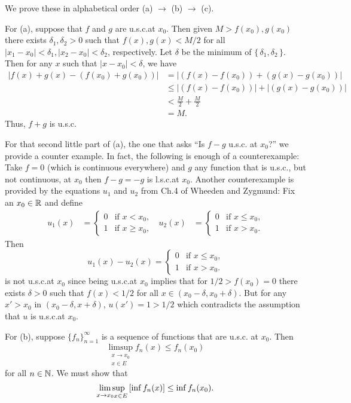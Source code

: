 \begin{solution}
  We prove these in alphabetical order (a) $\to$ (b) $\to$ (c).

  For (a), suppose that $f$ and $g$ are u.s.c.\@ at $x_0$. Then given
  $M>f(x_0),g(x_0)$ there exists $\delta_1,\delta_2>0$ such that
  $f(x),g(x)<M/2$ for all $|x_1-x_0|<\delta_1,|x_2-x_0|<\delta_2$,
  respectively. Let $\delta$ be the minimum of
  $\{\,\delta_1,\delta_2\,\}$. Then for any $x$ such that $|x-x_0|<\delta$,
  we have
  \begin{align*}
    |f(x)+g(x)-(f(x_0)+g(x_0))|
    &=|(f(x)-f(x_0))+(g(x)-g(x_0))|\\
    &\leq |(f(x)-f(x_0))|+|(g(x)-g(x_0))|\\
    &<\frac{M}{2}+\frac{M}{2}\\
    &=M.
  \end{align*}
  Thus, $f+g$ is u.s.c.

  For that second little part of (a), the one that asks ``Is $f-g$ u.s.c.\@
  at $x_0$?'' we provide a counter example. In fact, the following is enough of a
  counterexample: Take $f=0$ (which is continuous everywhere) and $g$ any
  function that is u.s.c.\@, but not continuous, at $x_0$ then $f-g=-g$ is
  l.s.c.\@ at $x_0$. Another counterexample is provided by the equations
  $u_1$ and $u_2$ from Ch.\@ 4 of Wheeden and Zygmund: Fix an $x_0\in\mathbb{R}$
  and define
  \begin{align*}
    u_1(x)&=\begin{cases}
      0&\text{if $x<x_0$,}\\
      1&\text{if $x\geq x_0$,}
    \end{cases}
    &
    u_2(x)&=\begin{cases}
      0&\text{if $x\leq x_0$,}\\
      1&\text{if $x>x_0$.}
    \end{cases}
  \end{align*}
  Then
  \[
    u_1(x)-u_2(x)=
    \begin{cases}
      0&\text{if $x\leq x_0$,}\\
      1&\text{if $x>x_0$.}
    \end{cases}
  \]
  is not u.s.c.\@ at $x_0$ since being u.s.c.\@ at $x_0$ implies that for
  $1/2>f(x_0)=0$ there exists $\delta>0$ such that $f(x)<1/2$ for all
  $x\in (x_0-\delta,x_0+\delta)$. But for any $x'>x_0$ in
  $(x_0-\delta,x+\delta)$, $u(x')=1>1/2$ which contradicts the assumption
  that $u$ is u.s.c.\@ at $x_0$.

  For (b), suppose $\{f_n\}_{n=1}^\infty$ is a sequence of functions that are u.s.c.\@
  at $x_0$. Then
  \[
    \limsup_{\substack{x\to x_0\\ x\in E}}f_n(x)\leq f_n(x_0)
  \]
  for all $n\in\mathbb{N}$. We must show that
  \[
    \limsup_{\substack{x\to x_0}\\ x\in E}\left[\inf f_n(x)\right]\leq \inf f_n(x_0).
  \]
\end{solution}

